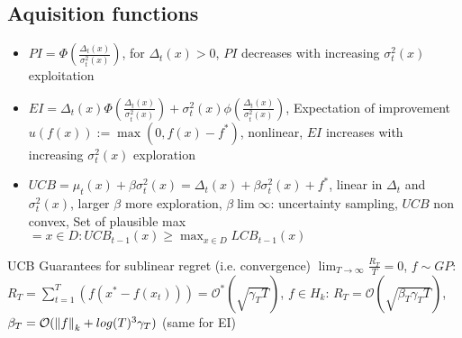 \subsection{Aquisition functions}
\begin{itemize}
    \item $PI = \Phi(\frac{\Delta_{t}(x)}{\sigma_{t}^{2}(x)})$,
    for $\Delta_{t}(x) >0$, $PI$ decreases with increasing $\sigma_{t}^{2}(x)$ \textrightarrow exploitation
    \item $EI = \Delta_{t}(x)\Phi(\frac{\Delta_{t}(x)}{\sigma_{t}^{2}(x)}) +
    \sigma_{t}^{2}(x) \phi(\frac{\Delta_{t}(x)}{\sigma_{t}^{2}(x)})$,
    Expectation of improvement $u(f(x)):= \max(0, f(x)-f^{*})$,
    nonlinear, $EI$ increases with increasing $\sigma_{t}^{2}(x)$ \textrightarrow exploration
    \item $UCB = \mu_{t}(x) + \beta \sigma_{t}^{2}(x) = \Delta_{t}(x) + \beta \sigma_{t}^{2}(x) + f^{*}$,
    linear in $\Delta_{t}$ and $\sigma_{t}^{2}(x)$, larger $\beta$ \textrightarrow more exploration,
    $\beta \lim \infty$: uncertainty sampling, $UCB$ non convex,
    Set of plausible max $={x \in D: UCB_{t-1}(x) \geq \max_{x \in D} LCB_{t-1}(x)}$
\end{itemize}

UCB Guarantees for sublinear regret (i.e. convergence) \textrightarrow $\lim_{T \rightarrow \infty} \frac{R_{T}}{T} =0$,
$f \sim GP$: $R_{T} = \sum_{t=1}^{T}(f(x^{*}-f(x_{t}))) = \mathcal{O}^{*}(\sqrt {\gamma_{T}T})$,
$f \in H_{k}$: $R_{T} = \mathcal{O}(\sqrt {\beta_{T}\gamma_{T}T})$,
$\beta_{T} = \mathcal{O}(\left\lVert f\right\rVert_{k} + log(T)^{3}\gamma_{T})$ (same for EI)




